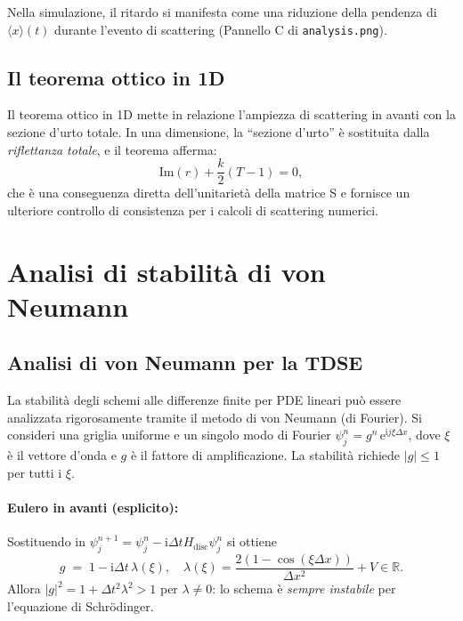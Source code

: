 \documentclass[12pt, a4paper]{article}
\newcommand{\dt}{\Delta t}
\newcommand{\dx}{\Delta x}
\newcommand{\ii}{\mathrm{i}}          %
\newcommand{\ee}{\mathrm{e}}          %
\begin{document}
Nella simulazione, il ritardo si manifesta come una riduzione della
pendenza di $\langle x\rangle(t)$ durante l'evento di scattering
(Pannello C di \texttt{analysis.png}).

\subsection{Il teorema ottico in 1D}

Il teorema ottico in 1D mette in relazione l'ampiezza di scattering
in avanti con la sezione d'urto totale.  In una dimensione, la
``sezione d'urto'' è sostituita dalla \emph{riflettanza totale}, e
il teorema afferma:
\begin{equation}
  \mathrm{Im}(r) + \frac{k}{2}(T-1) = 0,
\end{equation}
che è una conseguenza diretta dell'unitarietà della matrice S e
fornisce un ulteriore controllo di consistenza per i calcoli di
scattering numerici.

\section{Analisi di stabilità di von Neumann}
\label{app:stability}

\subsection{Analisi di von Neumann per la TDSE}

La stabilità degli schemi alle differenze finite per PDE lineari
può essere analizzata rigorosamente tramite il metodo di von Neumann
(di Fourier).  Si consideri una griglia uniforme e un singolo modo
di Fourier $\psi_j^n = g^n\,\ee^{\ii j\xi\dx}$, dove $\xi$ è il
vettore d'onda e $g$ è il fattore di amplificazione.  La stabilità
richiede $|g| \leq 1$ per tutti i $\xi$.

\paragraph{Eulero in avanti (esplicito):}
Sostituendo in $\psi_j^{n+1} = \psi_j^n - \ii\dt H_\text{disc}\psi_j^n$
si ottiene
\begin{equation}
  g \;=\; 1 - \ii\dt\,\lambda(\xi),
  \quad \lambda(\xi) = \frac{2(1-\cos(\xi\dx))}{\dx^2} + V \in \mathbb{R}.
\end{equation}
Allora $|g|^2 = 1 + \dt^2\lambda^2 > 1$ per $\lambda \neq 0$: lo
schema è \emph{sempre instabile} per l'equazione di Schr\"{o}dinger.
\end{document}
